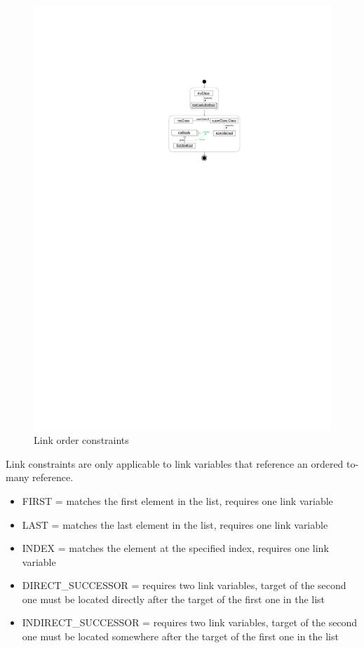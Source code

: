 \begin{figure}[p]
  \centering
  \includegraphics[scale=1.0]{figures/LinkConstraints1}
  \caption{Link order constraints}
  \label{fig:linkConstraints}
\end{figure}

Link constraints are only applicable to link variables that reference an ordered to-many reference. 
\begin{itemize}
  \item FIRST = matches the first element in the list, requires one link variable
  \item LAST = matches the last element in the list, requires one link variable
  \item INDEX = matches the element at the specified index, requires one link variable
  \item DIRECT\_SUCCESSOR = requires two link variables, target of the second one must be located directly after the target of the first one in the list
  \item INDIRECT\_SUCCESSOR = requires two link variables, target of the second one must be located somewhere after the target of the first one in the list
\end{itemize}

